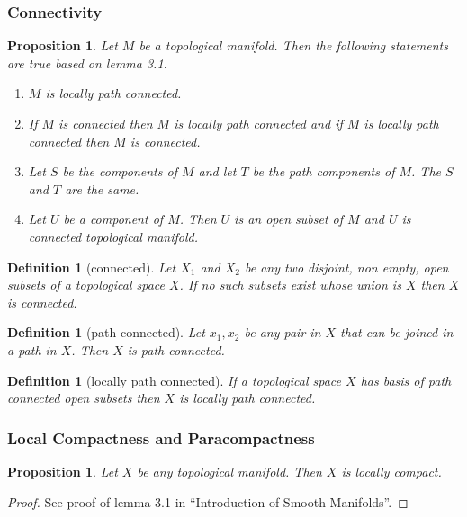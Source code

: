 \documentclass{article}
\newtheorem{proposition}[theorem]{Proposition}
\newtheorem{definition}[theorem]{Definition}
\begin{document}
\subsubsection{Connectivity}
\begin{proposition}
  Let $ M $ be a topological manifold.  Then the following statements are true based on lemma 3.1.
  \begin{enumerate}
  \item $ M $ is locally path connected.
  \item If $ M $ is connected then $ M $ is locally path connected and if $ M $ is locally path connected then $ M $ is connected.
  \item Let $ S $ be the components of $ M $ and let $ T $ be the path components of $ M $. The $ S $ and $ T $ are the same.
  \item Let $ U $ be a component of $ M $. Then $ U $ is an open subset of $ M $ and $ U $ is connected topological manifold.
  \end{enumerate}
\end{proposition}

\begin{definition}[connected]
Let $ X_{1} $ and $  X_{2} $ be any two disjoint, non empty,  open subsets of a topological space $ X $. If no such subsets exist whose union is $ X $ then $ X $ is connected.
\end{definition}
\begin{definition}[path connected]
  Let $ x_{1}, x_{2} $ be any pair in $ X $ that can be joined in a path in $ X $. Then $ X $ is path connected.
\end{definition}
\begin{definition}[locally path connected]
  If a topological space $ X $ has basis of path connected open subsets then $ X $ is locally path connected.
\end{definition}

\subsubsection{Local Compactness and Paracompactness}
\begin{proposition}
  Let $ X $ be any topological manifold. Then $ X $ is locally compact.
\end{proposition}

\begin{proof}
  See proof of lemma 3.1 in ``Introduction of Smooth Manifolds''.
\end{proof}
\end{document}
